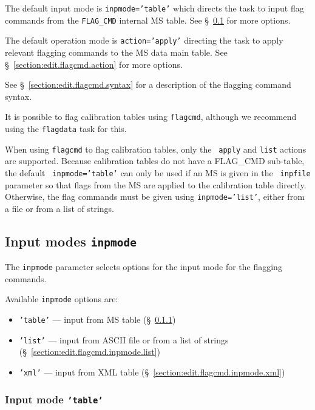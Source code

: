 The default input mode is {\tt inpmode='table'} which directs the
task to input flag commands from the {\tt FLAG\_CMD} internal MS
table. See \S~\ref{section:edit.flagcmd.inpmode} for more options.

The default operation mode is {\tt action='apply'} directing the
task to apply relevant flagging commands to the MS data main table.
See \S~\ref{section:edit.flagcmd.action} for more options.

See \S~\ref{section:edit.flagcmd.syntax} for a description of the
flagging command syntax.

It is possible to flag calibration tables using {\tt flagcmd}, although we
recommend using the {\tt flagdata} task for this.
    
When using {\tt flagcmd} to flag calibration tables, only the {\tt
  apply} and {\tt list} actions are supported.  Because calibration
tables do not have a FLAG\_CMD sub-table, the default {\tt
  inpmode='table'} can only be used if an MS is given in the {\tt
  inpfile} parameter so that flags from the MS are applied to the
calibration table directly. Otherwise, the flag commands must be given
using {\tt inpmode='list'}, either from a file or from a list of strings.


\subsection{Input modes {\tt inpmode}}
\label{section:edit.flagcmd.inpmode}

The {\tt inpmode} parameter selects options for the input mode for
the flagging commands.

Available {\tt inpmode} options are:
\begin{itemize}
   \item {\tt 'table'} --- input from MS table (\S~\ref{section:edit.flagcmd.inpmode.table})
   \item {\tt 'list'} --- input from ASCII file or from a list of
     strings (\S~\ref{section:edit.flagcmd.inpmode.list})
   \item {\tt 'xml'} --- input from XML table (\S~\ref{section:edit.flagcmd.inpmode.xml})
\end{itemize}

\subsubsection{Input mode {\tt 'table'}}
\label{section:edit.flagcmd.inpmode.table}

